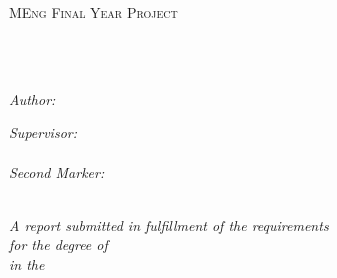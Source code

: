 \documentclass[
    11pt,
    oneside, %
    english,
    singlespacing, %
    parskip, %
    headsepline, %
]{MastersDoctoralThesis}
\author{Nicolás \textsc{D'Cotta}} %
\theoremstyle{definition}
\begin{document}
    \frontmatter
    \pagestyle{plain}


    \begin{titlepage}
        \begin{center}

            \vspace*{.06\textheight}
            {\scshape\LARGE \univname\par}\vspace{1.5cm}
            \textsc{\Large MEng Final Year Project}\\[0.5cm]

            \HRule \\[0.4cm]
            {\huge \bfseries \ttitle\par}\vspace{0.4cm} %
            \HRule \\[1.5cm]

            \begin{minipage}[t]{0.4\textwidth}
                \begin{flushleft}
                    \large
                    \emph{Author:}\\
                    \href{https://nico.dcotta.eu}{\authorname}
                \end{flushleft}
            \end{minipage}
            \begin{minipage}[t]{0.4\textwidth}
                \begin{flushright}
                    \large
                    \emph{Supervisor:} \\
                    \href{https://www.doc.ic.ac.uk/~wjk/}{\supname} \\[0.4 cm]
                    \emph{Second Marker:} \\
                    \href{https://www.imperial.ac.uk/people/paul.bilokon01}{\markername}
                \end{flushright}
            \end{minipage}\\[3cm]

            \vfill
            \large \textit{A report submitted in fulfillment of the requirements\\ for the degree of \degreename}\\[0.3cm] %
            \textit{in the}\\[0.4 cm]
            \facname \\ \deptname\\[2 cm]


\end{center}
\end{titlepage}
\end{document}
